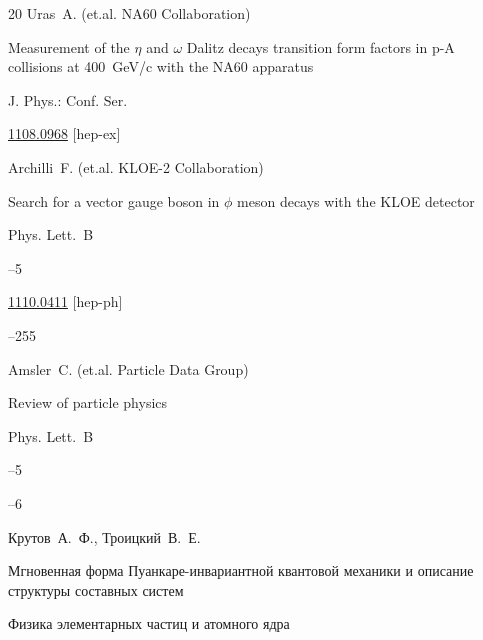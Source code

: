 \begin{thebibliography}{20}
\by Uras~A. (et.al. NA60 Collaboration)

\paper Measurement of the $\eta$ and $\omega$ Dalitz decays transition form factors in p-A collisions at 400~GeV/c with the NA60 apparatus

\jour J. Phys.: Conf. Ser. 






\arxiv \href{http://arxiv.org/abs/1108.0968}{1108.0968} [hep-ex]




\by Archilli~F. (et.al. KLOE-2 Collaboration)


\paper  Search for a vector gauge boson in $\phi$ meson decays with the KLOE detector

\jour Phys. Lett.~B


--5

\arxiv \href{http://arxiv.org/abs/1110.0411}{1110.0411} [hep-ph]


--255




\by Amsler~C. (et.al. Particle Data Group)

\paper   Review of particle physics

\jour Phys. Lett.~B



--5

--6









\by Крутов~А.~Ф., Троицкий~В.~Е.

\paper   Мгновенная форма Пуанкаре-инвариантной квантовой механики и описание структуры составных систем

\jour Физика элементарных частиц и атомного ядра


\end{thebibliography}
